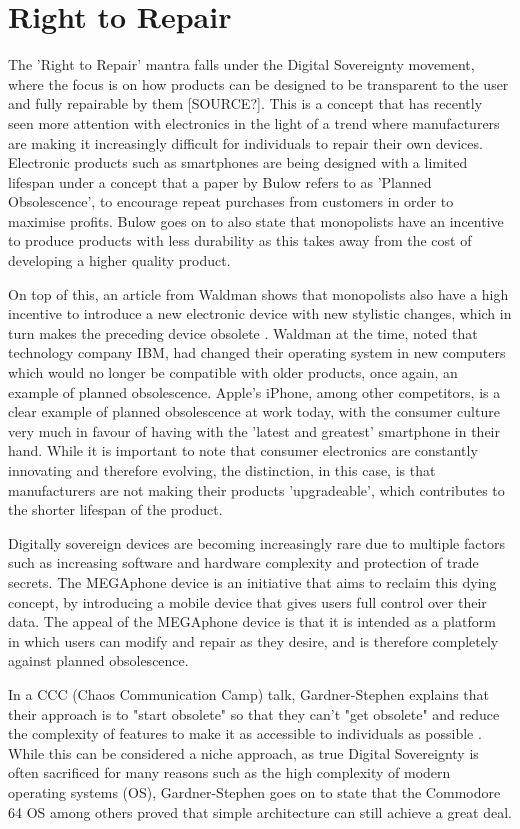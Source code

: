 \section{Right to Repair}

The 'Right to Repair' mantra falls under the Digital Sovereignty movement, where the focus is on how products can be designed to be transparent to the user and fully repairable by them [SOURCE?].
This is a concept that has recently seen more attention with electronics in the light of a trend where manufacturers are making it increasingly difficult for individuals to repair their own devices.
Electronic products such as smartphones are being designed with a limited lifespan under a concept that a paper by Bulow \cite{obsolescence} refers to as 'Planned Obsolescence', to encourage repeat purchases from customers in order to maximise profits.
Bulow goes on to also state that monopolists have an incentive to produce products with less durability as this takes away from the cost of developing a higher quality product.

On top of this, an article from Waldman shows that monopolists also have a high incentive to introduce a new electronic device with new stylistic changes, which in turn makes the preceding device obsolete \cite{obsolescence2}.
Waldman at the time, noted that technology company IBM, had changed their operating system in new computers which would no longer be compatible with older products, once again, an example of planned obsolescence.
Apple's iPhone, among other competitors, is a clear example of planned obsolescence at work today, with the consumer culture very much in favour of having with the 'latest and greatest' smartphone in their hand.
While it is important to note that consumer electronics are constantly innovating and therefore evolving, the distinction, in this case, is that manufacturers are not making their products 'upgradeable', which contributes to the shorter lifespan of the product.

Digitally sovereign devices are becoming increasingly rare due to multiple factors such as increasing software and hardware complexity and protection of trade secrets.
The MEGAphone device is an initiative that aims to reclaim this dying concept, by introducing a mobile device that gives users full control over their data.
The appeal of the MEGAphone device is that it is intended as a platform in which users can modify and repair as they desire, and is therefore completely against planned obsolescence.

In a CCC (Chaos Communication Camp) talk, Gardner-Stephen explains that their approach is to "start obsolete" so that they can't "get obsolete" and reduce the complexity of features to make it as accessible to individuals as possible \cite{mobilehistory}.
While this can be considered a niche approach, as true Digital Sovereignty is often sacrificed for many reasons such as the high complexity of modern operating systems (OS), Gardner-Stephen goes on to state that the Commodore 64 OS among others proved that simple architecture can still achieve a great deal.

